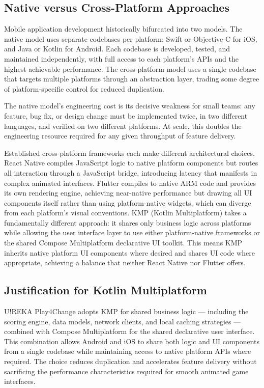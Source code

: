 \subsection{Native versus Cross-Platform Approaches}

Mobile application development historically bifurcated into two models. The native model uses separate codebases per platform: Swift or Objective-C for iOS, and Java or Kotlin for Android. Each codebase is developed, tested, and maintained independently, with full access to each platform's APIs and the highest achievable performance. The cross-platform model uses a single codebase that targets multiple platforms through an abstraction layer, trading some degree of platform-specific control for reduced duplication.

The native model's engineering cost is its decisive weakness for small teams: any feature, bug fix, or design change must be implemented twice, in two different languages, and verified on two different platforms. At scale, this doubles the engineering resource required for any given throughput of feature delivery.

Established cross-platform frameworks each make different architectural choices. React Native compiles JavaScript logic to native platform components but routes all interaction through a JavaScript bridge, introducing latency that manifests in complex animated interfaces. Flutter compiles to native ARM code and provides its own rendering engine, achieving near-native performance but drawing all UI components itself rather than using platform-native widgets, which can diverge from each platform's visual conventions. KMP (Kotlin Multiplatform) takes a fundamentally different approach: it shares only business logic across platforms while allowing the user interface layer to use either platform-native frameworks or the shared Compose Multiplatform declarative UI toolkit. This means KMP inherits native platform UI components where desired and shares UI code where appropriate, achieving a balance that neither React Native nor Flutter offers.

\subsection{Justification for Kotlin Multiplatform}

U!REKA Play4Change adopts KMP for shared business logic --- including the scoring engine, data models, network clients, and local caching strategies --- combined with Compose Multiplatform for the shared declarative user interface. This combination allows Android and iOS to share both logic and UI components from a single codebase while maintaining access to native platform APIs where required. The choice reduces duplication and accelerates feature delivery without sacrificing the performance characteristics required for smooth animated game interfaces.

